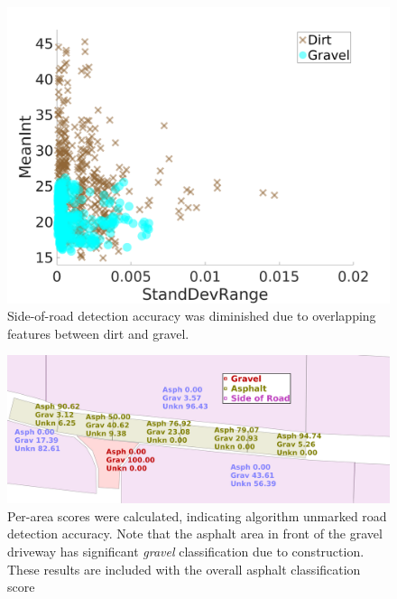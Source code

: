 \documentclass[journal,onecolumn]{IEEEtran}
\begin{document}
		\begin{figure}[H]
			\centering
			\includegraphics[width=0.75\linewidth]{figures/dirt_v_gravel2}
			\caption[Re-grassed Dirt vs Gravel]{Side-of-road detection accuracy was diminished due to overlapping features between dirt and gravel. }
			\label{fig:dirt_v_gravel}
		\end{figure}
	
		\begin{figure}[H]
			\centering
			\includegraphics[width=0.75\linewidth]{figures/range_actual_rm_db_4_area_score}
			\caption[Area Scores]{Per-area scores were calculated, indicating algorithm unmarked road detection accuracy. Note that the asphalt area in front of the gravel driveway has significant \textit{gravel} classification due to construction. These results are included with the overall asphalt classification score}
			\label{fig:prepostadjust}
		\end{figure}
	
\end{document}
